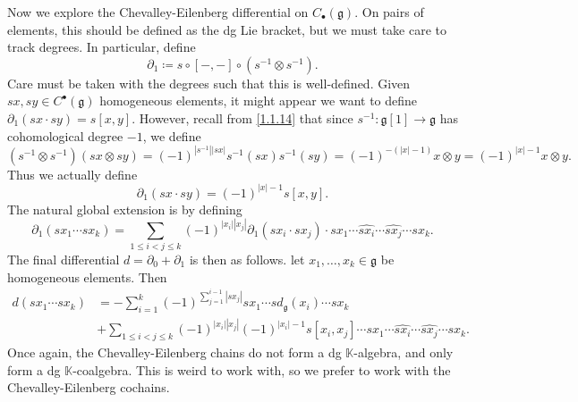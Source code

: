 \begin{discussion}
	Now we explore the Chevalley-Eilenberg differential on $C_{\bullet} (\mathfrak{g} )$. On pairs of elements, this should be defined as the dg Lie bracket, but we must take care to track degrees. In particular, define
	\[
		\partial _1 \coloneqq s \circ [-,-] \circ (s ^{-1} \otimes s ^{-1} )
	.\]
	Care must be taken with the degrees such that this is well-defined. Given $sx,sy\in C^{\bullet} (\mathfrak{g} )$ homogeneous elements, it might appear we want to define $\partial _1(sx\cdot sy)=s[x,y]$. However, recall from \cref{1.1.14} that since $s ^{-1} : \mathfrak{g} [1] \to \mathfrak{g} $ has cohomological degree $-1$, we define
	\[
		(s ^{-1} \otimes s ^{-1} )(sx \otimes sy) = (-1)^{\left| s ^{-1}  \right| \left| sx \right| } s ^{-1} (sx) s ^{-1} (sy) = (-1)^{-(\left| x \right|-1) } x\otimes y=(-1)^{\left| x \right| -1} x\otimes y
	.\]
	Thus we actually define
	\[
		\partial _1(sx \cdot sy) = (-1)^{\left| x \right| -1} s[x,y]
	.\]
	The natural global extension is by defining
	\[
		\partial _1(sx_1 \cdots sx_k) = \sum_{1\leq i<j\leq k} (-1)^{\left| x_i \right| \left| x_j \right| } \partial _1(sx_i \cdot sx_j)\cdot sx_1 \cdots \widehat{sx_i}\cdots \widehat{sx_j}\cdots sx_k
	.\]
	The final differential $d=\partial _0+\partial _1$ is then as follows. let $x_1, \ldots ,x_k\in \mathfrak{g} $ be homogeneous elements. Then
	\begin{align*}
		d(sx_1\cdots sx_k) &= -\sum_{i=1}^{k} (-1)^{\sum_{j=1}^{i-1} \left| sx_j \right| } sx_1 \cdots sd_\mathfrak{g}(x_i)\cdots sx_k\\
				   &+\sum_{1\leq i<j\leq k} (-1)^{\left| x_i \right| \left| x_j \right| } (-1)^{\left| x_i \right| -1} s[x_i,x_j]\cdots sx_1 \cdots \widehat{sx_i}\cdots \widehat{sx_j}\cdots sx_k
	.\end{align*}
	Once again, the Chevalley-Eilenberg chains do not form a dg $\mathbb{K} $-algebra, and only form a dg $\mathbb{K} $-coalgebra. This is weird to work with, so we prefer to work with the Chevalley-Eilenberg cochains.
\end{discussion}



